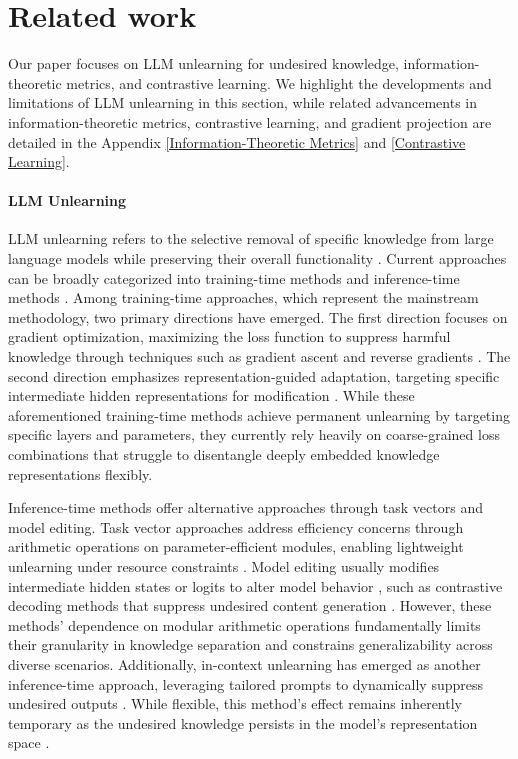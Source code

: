 \section{Related work}
Our paper focuses on LLM unlearning for undesired knowledge, information-theoretic metrics, and contrastive learning. We highlight the developments and limitations of LLM unlearning in this section, while related advancements in information-theoretic metrics, contrastive learning, and gradient projection are detailed in the Appendix \ref{Information-Theoretic Metrics} and \ref{Contrastive Learning}.
\paragraph{LLM Unlearning}
LLM unlearning refers to the selective removal of specific knowledge from large language models while preserving their overall functionality \cite{zhang2024right}. Current approaches can be broadly categorized into training-time methods and inference-time methods \cite{barez2025openproblemsmachineunlearning}. Among training-time approaches, which represent the mainstream methodology, two primary directions have emerged. The first direction focuses on gradient optimization, maximizing the loss function to suppress harmful knowledge through techniques such as gradient ascent \cite{yao2023large,jang-etal-2023-knowledge} and reverse gradients \cite{eldan2023s}. The second direction emphasizes representation-guided adaptation, targeting specific intermediate hidden representations for modification \cite{li2024the}. While these aforementioned training-time methods achieve permanent unlearning by targeting specific layers and parameters, they currently rely heavily on coarse-grained loss combinations that struggle to disentangle deeply embedded knowledge representations flexibly.

Inference-time methods offer alternative approaches through task vectors and model editing. Task vector approaches address efficiency concerns through arithmetic operations on parameter-efficient modules, enabling lightweight unlearning under resource constraints \cite{ilharco2023editing,zhang2023composing}. Model editing usually modifies intermediate hidden states or logits to alter model behavior \cite{barez2025openproblemsmachineunlearning}, such as contrastive decoding methods that suppress undesired content generation \cite{zhong2024rose}. However, these methods' dependence on modular arithmetic operations fundamentally limits their granularity in knowledge separation and constrains generalizability across diverse scenarios. Additionally, in-context unlearning has emerged as another inference-time approach, leveraging tailored prompts to dynamically suppress undesired outputs \cite{zheng2023can,pawelczyk2024incontext}. While flexible, this method's effect remains inherently temporary as the undesired knowledge persists in the model's representation space \cite{liu2024rethinking}.

